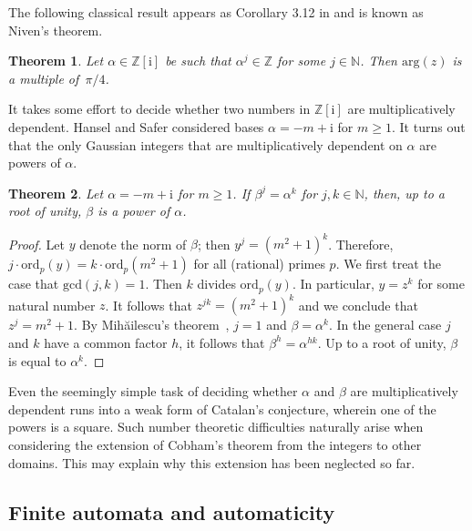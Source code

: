 \documentclass{amsart}
\newcommand{\ii}{\mathrm{i}}
\newtheorem{theorem}{Theorem}
\newtheorem*{main theorem}{Theorem \ref{thm:main-gaussian}}
\theoremstyle{definition}
\begin{document}
The following classical result
appears as Corollary 3.12 in \cite{niven} and is known as
Niven's theorem.
\begin{theorem}\label{thm:niven}
    Let $\alpha\in\mathbb{Z}[\ii ]$ be such that $\alpha^j\in \mathbb Z$
    for some $j\in\mathbb N$. Then $\text{arg}(z)$ is a multiple of~$\pi/4$.
\end{theorem}
 It takes some effort to decide whether two numbers in $\mathbb{Z}[\ii ]$   are multiplicatively dependent.  Hansel and Safer considered bases $\alpha=-m+\ii $ for $m\geq 1$. It turns out that
the only Gaussian integers that are multiplicatively dependent on $\alpha$ are powers
of $\alpha$.
\begin{theorem}\label{thm:mult-ind}
    Let $\alpha=-m+\ii $ for $m\geq 1$. If $\beta^j=\alpha^k$ for $j,k\in\mathbb N$,
    then, up to a root of unity, $\beta$ is a power of $\alpha$.
\end{theorem}
\begin{proof}
    Let $y$ denote the norm of $\beta$; then $y^j=(m^2+1)^k$.
    Therefore, $j\cdot\text{ord}_p(y)=k\cdot\text{ord}_p(m^2+1)$ for all (rational) primes $p$. 
    We first treat the case that $\text{gcd}(j,k)=1$.
    Then $k$ divides $\text{ord}_p(y)$. In particular, $y=z^k$ for
    some natural number $z$. It follows that $z^{jk}=(m^2+1)^k$ and we conclude that $z^j=m^2+1$.
    By
    Mih{\u{a}}ilescu's theorem~\cite{mihailescu2004}, $j=1$ and $\beta=\alpha^k$. In the general case $j$
    and $k$ have a common factor $h$, it follows that $\beta^h=\alpha^{hk}$. Up to a root of unity,
    $\beta$ is equal to $\alpha^k$.
\end{proof}
Even the seemingly simple task of deciding whether 
$\alpha$ and $\beta$ are multiplicatively dependent runs into a weak 
form of Catalan's conjecture, wherein one of the powers is a square.
Such number theoretic difficulties naturally arise when considering
the extension of Cobham's theorem from the integers to other domains.
This may explain why this extension has been neglected so far.

\subsection{Finite automata and automaticity}
\end{document}
